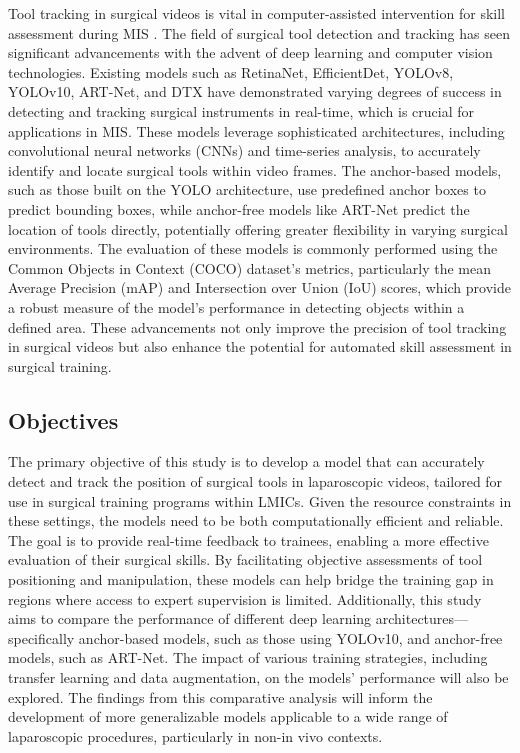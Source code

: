 Tool tracking in surgical videos is vital in computer-assisted intervention for skill assessment during MIS \cite{nwoye_cholectrack20_2023}. The field of surgical tool detection and tracking has seen significant advancements with the advent of deep learning and computer vision technologies. Existing models such as RetinaNet, EfficientDet, YOLOv8, YOLOv10, ART-Net, and DTX have demonstrated varying degrees of success in detecting and tracking surgical instruments in real-time, which is crucial for applications in MIS. These models leverage sophisticated architectures, including convolutional neural networks (CNNs) and time-series analysis, to accurately identify and locate surgical tools within video frames. The anchor-based models, such as those built on the YOLO architecture, use predefined anchor boxes to predict bounding boxes, while anchor-free models like ART-Net predict the location of tools directly, potentially offering greater flexibility in varying surgical environments. The evaluation of these models is commonly performed using the Common Objects in Context (COCO) dataset's metrics, particularly the mean Average Precision (mAP) and Intersection over Union (IoU) scores, which provide a robust measure of the model's performance in detecting objects within a defined area. These advancements not only improve the precision of tool tracking in surgical videos but also enhance the potential for automated skill assessment in surgical training.

\subsection{Objectives}

The primary objective of this study is to develop a model that can accurately detect and track the position of surgical tools in laparoscopic videos, tailored for use in surgical training programs within LMICs. Given the resource constraints in these settings, the models need to be both computationally efficient and reliable. The goal is to provide real-time feedback to trainees, enabling a more effective evaluation of their surgical skills. By facilitating objective assessments of tool positioning and manipulation, these models can help bridge the training gap in regions where access to expert supervision is limited. Additionally, this study aims to compare the performance of different deep learning architectures—specifically anchor-based models, such as those using YOLOv10, and anchor-free models, such as ART-Net. The impact of various training strategies, including transfer learning and data augmentation, on the models' performance will also be explored. The findings from this comparative analysis will inform the development of more generalizable models applicable to a wide range of laparoscopic procedures, particularly in non-in vivo contexts.

